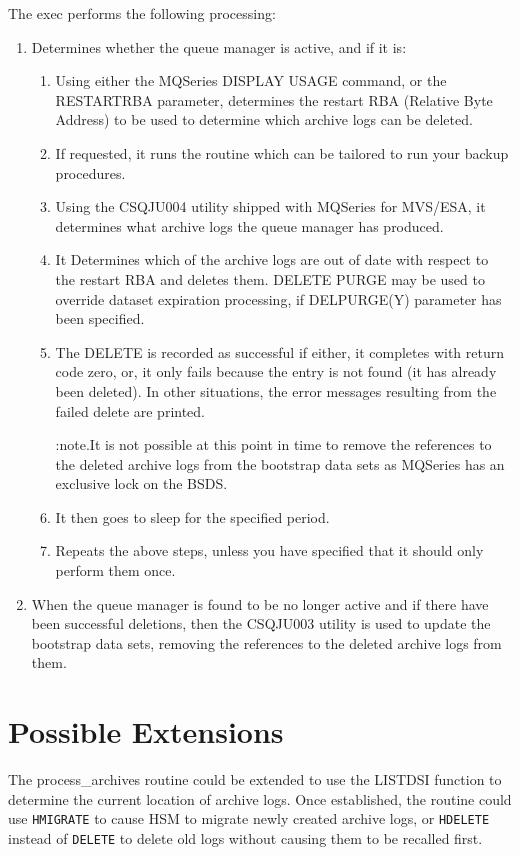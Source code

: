 \documentclass[a4paper,12pt]{report}
\begin{document}
The exec performs the following processing:
\begin{enumerate}
\item Determines whether the queue manager is active, and if it is:
\begin{enumerate}
\item Using either the MQSeries DISPLAY USAGE command, or the RESTARTRBA
parameter, determines the restart RBA
(Relative Byte Address) to be used to determine which archive logs can
be deleted.
\item If requested, it runs the routine which can be tailored to run your
backup procedures.
\item Using the CSQJU004 utility shipped with MQSeries for MVS/ESA,
it determines what archive logs the queue manager has produced.
\item It Determines which of the archive logs are out of date with respect
to the restart RBA and deletes them.  DELETE PURGE may be used to
override dataset expiration processing, if DELPURGE(Y) parameter has
been specified.
\item The DELETE is recorded as successful if either, it completes with
return code zero, or, it only fails because the entry is not found (it
has already been deleted).  In other situations, the error messages
resulting from the failed delete are printed.

:note.It is not possible at this point in time to remove the references
to the deleted archive logs from the bootstrap data sets as MQSeries has
an exclusive lock on the BSDS.
\item It then goes to sleep for the specified period.
\item Repeats the above steps, unless you have specified that it should
only perform them once.
\end{enumerate}
\item When the queue manager is found to be no longer active and if
there have been successful deletions, then
the
CSQJU003 utility is used to update the bootstrap data sets, removing the
references to the deleted archive logs from them.
\end{enumerate}
\section{Possible Extensions}
The process\_archives routine could be extended to use the LISTDSI
function to determine the current location of archive logs.
Once established, the routine could use \verb!HMIGRATE! to cause
HSM to migrate newly created archive logs, or \verb!HDELETE! instead
of \verb!DELETE! to delete old logs without causing them to be
recalled first.
\end{document}

